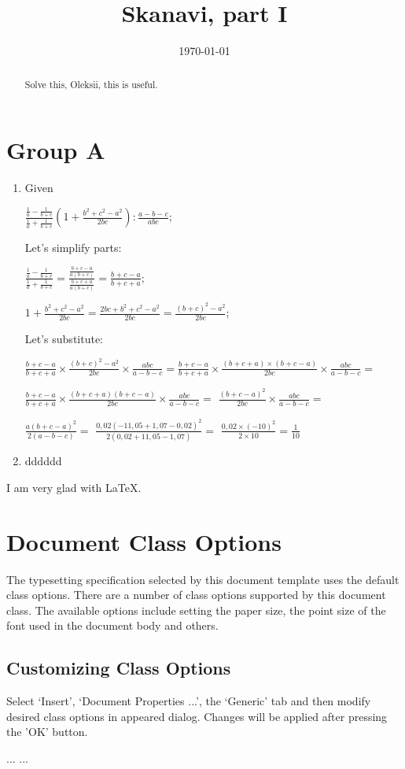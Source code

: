 \documentclass{article}
\begin{document}
\title{Skanavi, part I}  
\date{\today}
\maketitle

\begin{abstract}
    Solve this, Oleksii, this is useful. 
\end{abstract}

\section{Group A}

\begin{enumerate}
\item Given {$\frac{\frac{1}{a}-\frac{1}{b+c}}{\frac{1}{a} + \frac{1}{b+c}}(1+\frac{b^{2}+c^{2}-a^{2}}{2bc}):\frac{a-b-c}{abc};$
 
Let's simplify parts: 
 
$\frac{\frac{1}{a}-\frac{1}{b+c}}{\frac{1}{a} + \frac{1}{b+c}}=\frac{\frac{b+c-a}{a(b+c)}}{\frac{b+c+a}{a(b+c)}}=\frac{b+c-a}{b+c+a};$

$1+\frac{b^{2}+c^{2}-a^{2}}{2bc}=\frac{2bc+b^{2}+c^{2}-a^2}{2bc}=\frac{(b+c)^{2}-a^2}{2bc};$

Let's substitute:

$\frac{b+c-a}{b+c+a}\times\frac{(b+c)^{2}-a^2}{2bc}\times\frac{abc}{a-b-c}=\frac{b+c-a}{b+c+a}\times\frac{(b+c+a)\times(b+c-a)}{2bc}\times\frac{abc}{a-b-c}=$

$\frac{b+c-a}{b+c+a}\times\frac{(b+c+a)(b+c-a)}{2bc}\times\frac{abc}{a-b-c}=$ $\frac{(b+c-a)^2}{2bc}\times\frac{abc}{a-b-c}=$

$\frac{a(b+c-a)^2}{2(a-b-c)}=$ $\frac{0,02(-11,05+1,07-0,02)^2}{2(0,02+11,05-1,07)}=$ $\frac{0,02 \times (-10)^2}{2 \times 10}=\frac{1}{10}$
}

\item dddddd

\end{enumerate}

I am very glad with LaTeX{}.

\section{Document Class Options}
The typesetting specification selected by this document template
uses the default class options. There are a number of class options 
supported by this document class. The available options include 
setting the paper size, the point size of the font used in the 
document body and others.

\subsection{Customizing Class Options}
Select `Insert', `Document Properties ...', the `Generic' tab
and then modify desired class options in appeared dialog.
Changes will be applied after pressing the 'OK' button.

\begin{thebibliography}{99}
 ...
 ...
\end{thebibliography}
\end{document}
